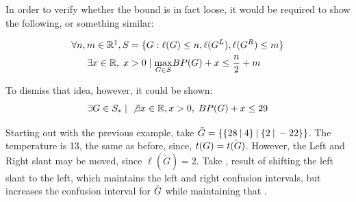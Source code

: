 In order to verify whether the bound is in fact loose, it would be required to show the following, or something similar:

\begin{align*}
\forall n, m \in \mathbb{R}\footnotemark, S &= \{G : \ell(G) \leq n, \ell(G^L),\ell(G^R) \leq m\} \\
\exists x\in \mathbb{R},\; x &> 0\;|\; \underset{G\in S}{\max}BP(G) + x \leq \frac{n}{2} + m
\end{align*}


To dismiss that idea, however, it could be shown:
$$
\exists G \in S_*\;|\;\not\exists x \in \mathbb{R}, x>0,\; BP(G) + x \leq 29
$$

Starting out with the previous example, take $\tilde{G} = \mbox{$\{\mbox{$\{28\:|\:4\}$}\:|\:\mbox{$\{2\:|\:-22\}$}\}$}$. The temperature is 13, the same as before, since, $t(\mbox{$G$}) = \tilde{t(\mbox{$G$})}$. However, the Left and Right slant may be moved, since $\ell(\tilde{G}) = 2$. Take , result of shifting the left slant to the left, which maintains the left and right confusion intervals, but increases the confusion interval for $\tilde{\mbox{$G$}}$ while maintaining that .

